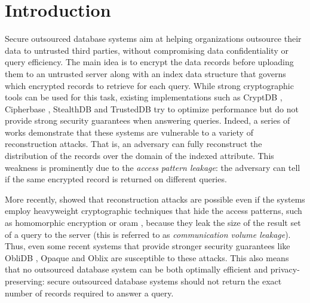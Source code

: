 \section{Introduction}

	Secure outsourced database systems aim at helping organizations outsource their data to untrusted third parties, without compromising data confidentiality or query efficiency.
	The main idea is to encrypt the data records before uploading them to an untrusted server along with an index data structure that governs which encrypted records to retrieve for each query.
	While strong cryptographic tools can be used for this task, existing implementations such as CryptDB \cite{crypt-db}, Cipherbase \cite{cipherbase-daas}, StealthDB \cite{stealth-db} and TrustedDB \cite{trusted-db} try to optimize performance but do not provide strong security guarantees when answering queries.
	Indeed, a series of works \cite{multidimensional-range-queries, inference-attack-islam-14, leakage-abuse-attacks-cash-15, inference-attacks-naveed-15, generic-attacks-kellaris, attacks-tao-of-inference, grubbs-attacks, access-pattern-disclosure, attacks-improved-reconstruction} demonstrate that these systems are vulnerable to a variety of reconstruction attacks.
	That is, an adversary can fully reconstruct the distribution of the records over the domain of the indexed attribute.
	This weakness is prominently due to the \emph{access pattern leakage}: the adversary can tell if the same encrypted record is returned on different queries.

	More recently, \cite{generic-attacks-kellaris, state-of-uniform, attacks-improved-reconstruction, pump-volume-attacks, volume-range-attacks} showed that reconstruction attacks are possible even if the systems employ heavyweight cryptographic techniques that hide the access patterns, such as homomorphic encryption \cite{arbitrary-functions-encrypted, fully-homomorphic-encryption} or \acrfull{oram} \cite{oram-theory, oram-original}, because they leak the size of the result set of a query to the server (this is referred to as \emph{communication volume leakage}). %
	Thus, even some recent systems that provide stronger security guarantees like ObliDB \cite{oblidb}, Opaque \cite{opaque} and Oblix \cite{oblix} are susceptible to these attacks. %
	This also means that no outsourced database system can be both optimally efficient and privacy-preserving: secure outsourced database systems should not return the exact number of records required to answer a query.

